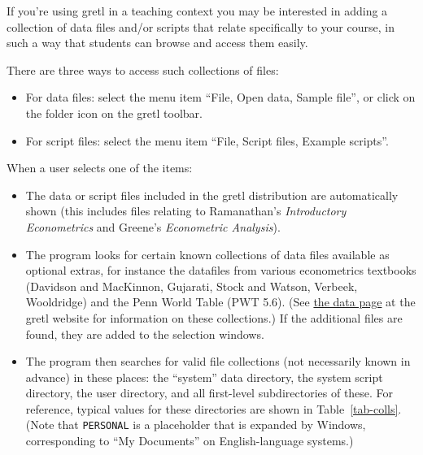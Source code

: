 If you're using gretl in a teaching context you may be
interested in adding a collection of data files and/or scripts that
relate specifically to your course, in such a way that students can
browse and access them easily.

There are three ways to access such collections of files:

\begin{itemize}
\item For data files: select the menu item ``File, Open data, Sample
  file'', or click on the folder icon on the gretl toolbar.
\item For script files: select the menu item ``File, Script
  files, Example scripts''.
\end{itemize}

When a user selects one of the items:

\begin{itemize}
\item The data or script files included in the gretl distribution are
  automatically shown (this includes files relating to Ramanathan's
  \emph{Introductory Econometrics} and Greene's \emph{Econometric
    Analysis}).
\item The program looks for certain known collections of data files
  available as optional extras, for instance the datafiles from
  various econometrics textbooks (Davidson and MacKinnon, Gujarati,
  Stock and Watson, Verbeek, Wooldridge) and the Penn World Table (PWT
  5.6).  (See \href{http://gretl.sourceforge.net/gretl_data.html}{the
    data page} at the gretl website for information on these
  collections.)  If the additional files are found, they are added to
  the selection windows.
\item The program then searches for valid file collections (not
  necessarily known in advance) in these places: the ``system'' data
  directory, the system script directory, the user directory, and all
  first-level subdirectories of these.  For reference, typical values
  for these directories are shown in Table~\ref{tab-colls}.  (Note that
  \texttt{PERSONAL} is a placeholder that is expanded by Windows,
  corresponding to ``My Documents'' on English-language systems.)
\end{itemize}

